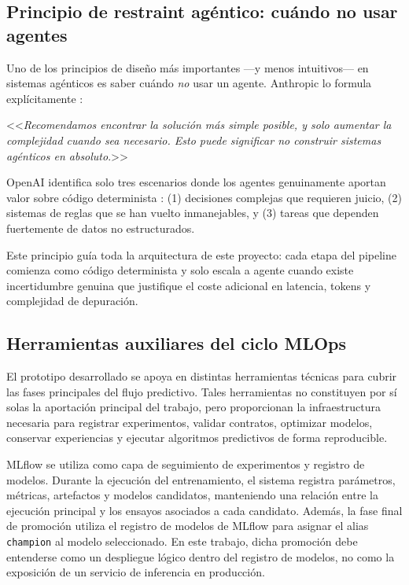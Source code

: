 \documentclass[12pt,a4paper]{article}
\theoremstyle{plain}
\begin{document}
\subsection{Principio de restraint agéntico: cuándo no usar agentes}
\label{sec:restraint}


Uno de los principios de diseño más importantes ---y menos intuitivos--- en sistemas agénticos es saber cuándo \emph{no} usar un agente. Anthropic lo formula explícitamente \cite{anthropic_agents}: 
\vspace{-0.8cm}
\begin{center}
    <<\emph{Recomendamos encontrar la solución más simple posible, y solo aumentar la complejidad cuando sea necesario. Esto puede significar no construir sistemas agénticos en absoluto}.>>
\end{center}

OpenAI identifica solo tres escenarios donde los agentes genuinamente aportan valor sobre código determinista \cite{openai_agents_guide}: (1) decisiones complejas que requieren juicio, (2) sistemas de reglas que se han vuelto inmanejables, y (3) tareas que dependen fuertemente de datos no estructurados.

Este principio guía toda la arquitectura de este proyecto: cada etapa del pipeline comienza como código determinista y solo escala a agente cuando existe incertidumbre genuina que justifique el coste adicional en latencia, tokens y complejidad de depuración.

\subsection{Herramientas auxiliares del ciclo MLOps}

El prototipo desarrollado se apoya en distintas herramientas técnicas para cubrir las fases principales del flujo predictivo. Tales herramientas no constituyen por sí solas la aportación principal del trabajo, pero proporcionan la infraestructura necesaria para registrar experimentos, validar contratos, optimizar modelos, conservar experiencias y ejecutar algoritmos predictivos de forma reproducible.

MLflow se utiliza como capa de seguimiento de experimentos y registro de modelos. Durante la ejecución del entrenamiento, el sistema registra parámetros, métricas, artefactos y modelos candidatos, manteniendo una relación entre la ejecución principal y los ensayos asociados a cada candidato. Además, la fase final de promoción utiliza el registro de modelos de MLflow para asignar el alias \texttt{champion} al modelo seleccionado. En este trabajo, dicha promoción debe entenderse como un despliegue lógico dentro del registro de modelos, no como la exposición de un servicio de inferencia en producción.
\end{document}
